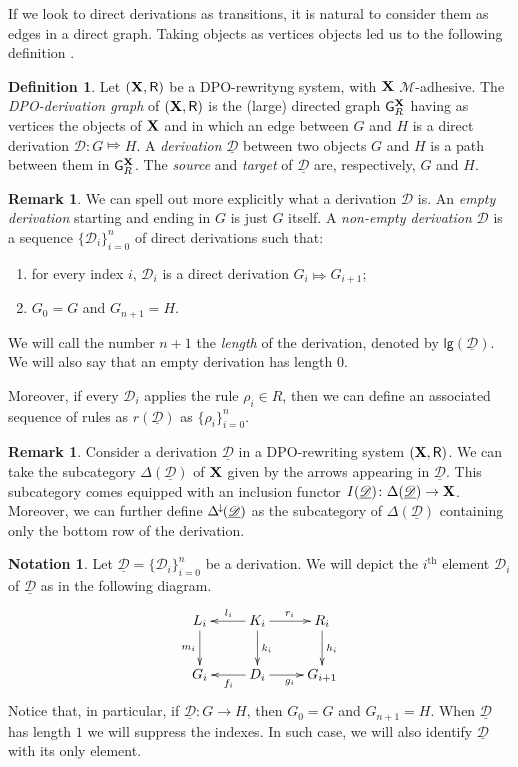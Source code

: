 \documentclass[a4paper]{article}
\newcommand{\Deltamin}{\Delta^{\hspace{-1pt}\downarrow\hspace{-1pt}}}
\def\R{\mathsf{R}}
\def\X{\textbf {\textup{X}}}
\newcommand{\dder}[1]{\mathscr{#1}}
\newcommand{\der}[1]{\underline{\dder{#1}}}
\def\gpo{\mathsf{G}^{\X}_R}
\newcommand{\lgh}[0]{\mathsf{lg}}
\theoremstyle{definition}
\newtheorem{definition}[theorem]{Definition}
\newtheorem*{notation}{Notation}
\newtheorem{remark}[theorem]{Remark}
\begin{document}
If we look to direct derivations as transitions, it is natural to consider them as edges in a direct graph. Taking objects as vertices objects led us to the following definition \cite{heindel2009category}.

\begin{definition}
	Let $(\X, \R)$ be a DPO-rewrityng system, with $\X$ $\mathcal{M}$-adhesive. The \emph{DPO-derivation graph} of $(\X, \R)$ is the (large)  directed graph $\gpo$ having as vertices the objects of $\X$ and in which an edge between $G$ and $H$ is a direct derivation $\dder{D}\colon G\Mapsto H$.	A \emph{derivation} $\der{D}$ between two objects $G$ and $H$ is a path between them in $\gpo$. The \emph{source} and \emph{target} of $\der{D}$ are, respectively, $G$ and $H$.
\end{definition}

\begin{remark}
We can spell out more explicitly what  a derivation $\dder{D}$ is.  An \emph{empty derivation} starting and ending in $G$ is just $G$ itself.  A \emph{non-empty derivation} $\dder{D}$ is a sequence $\{\dder{D}_i\}_{i=0}^n$ of direct derivations such that:
\begin{enumerate}
	\item for every index $i$, $\dder{D}_i$ is a direct derivation $G_i \Mapsto G_{i+1}$;
	\item $G_0=G$ and $G_{n+1}=H$.
\end{enumerate}

We will call the number $n+1$ the \emph{length} of the derivation, denoted by $\lgh(\der{D})$. We will also say that an empty derivation has length $0$. 

Moreover,  if every $\dder{D}_i$ applies the rule $\rho_i\in R$, then we can define an associated sequence of rules as $r(\der{D})$ as $\{\rho_i\}_{i=0}^n$.
\end{remark}

\begin{remark}\label{rem:func}
	Consider a derivation $\der{D}$ in a DPO-rewriting system $(\X, \R)$. We can take the subcategory $\Delta(\der{D})$ of $\X$ given by the arrows appearing in $\der{D}$. This subcategory comes equipped with an inclusion functor $I(\der{D})\colon \Delta(\der{D})\to \X$. Moreover, we can further define $\Deltamin(\der{D})$ as the subcategory of $\Delta(\der{D})$ containing only the bottom row of the derivation.
\end{remark}
	
\begin{notation}Let $\der{D}=\{\dder{D}_i\}_{i=0}^n$ be a derivation. We will depict the $i^\text{th}$ element $\dder{D}_i$ of $\der{D}$ as in the following diagram.  
	\[\xymatrix{L_i \ar[d]_{m_i}& K_i \ar[d]^{k_i}\ar[l]_{l_i} \ar[r]^{r_i} & R_i \ar[d]^{h_i} \\G_{i} & \ar[l]^{f_{i}} D_{i} \ar[r]_{g_{i}}& G_{i+1} }\]
	Notice that, in particular, if $\der{D}\colon G\to H$, then $G_0=G$ and $G_{n+1}=H$. When $\der{D}$ has length $1$ we will suppress the indexes. In such case, we will also identify $\der{D}$ with its only element. 
\end{notation} 
\end{document}
